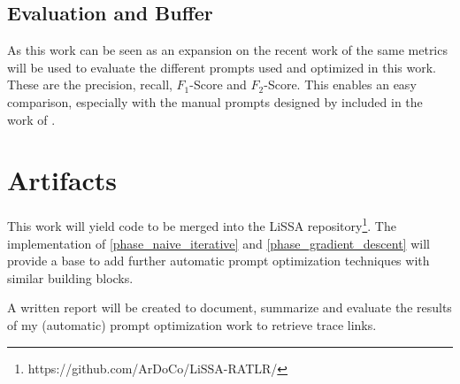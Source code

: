 \subsection{Evaluation and Buffer}
\label{phase_evaluation}
As this work can be seen as an expansion on the recent work of  the same metrics will be used to evaluate the different prompts used and optimized in this work. These are the precision, recall, $F_1$-Score and $F_2$-Score. This enables an easy comparison, especially with the manual prompts designed by  included in the work of \citeauthor{hey2025RequirementsTraceability}.









\section{Artifacts}
This work will yield code to be merged into the LiSSA repository\footnote{https://github.com/ArDoCo/LiSSA-RATLR/}. The implementation of \ref{phase_naive_iterative} and \ref{phase_gradient_descent} will provide a base to add further automatic prompt optimization techniques with similar building blocks.

A written report will be created to document, summarize and evaluate the results of my (automatic) prompt optimization work to retrieve trace links.




